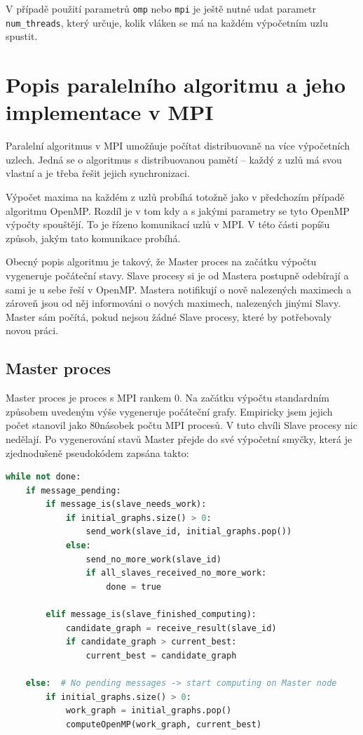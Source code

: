 \documentclass[czech]{article}
\newcommand{\graphspermpiproc}{80}
\begin{document}
V případě použití parametrů \texttt{omp} nebo \texttt{mpi} je ještě nutné udat parametr \texttt{num\_threads}, který určuje, kolik vláken se má na každém výpočetním uzlu spustit.

\section{Popis paralelního algoritmu a jeho implementace v MPI}
Paralelní algoritmus v MPI umožňuje počítat distribuovaně na více výpočetních uzlech. Jedná se o algoritmus s distribuovanou pamětí -- každý z uzlů má svou vlastní a je třeba řešit jejich synchronizaci.

Výpočet maxima na každém z uzlů probíhá totožně jako v předchozím případě algoritmu OpenMP. Rozdíl je v tom kdy a s jakými parametry se tyto OpenMP výpočty spouštějí. To je řízeno komunikací uzlů v MPI. V této části popíšu způsob, jakým tato komunikace probíhá.

Obecný popis algoritmu je takový, že Master proces na začátku výpočtu vygeneruje počáteční stavy. Slave procesy si je od Mastera postupně odebírají a sami je u sebe řeší v OpenMP. Mastera notifikují o nově nalezených maximech a zároveň jsou od něj informováni o nových maximech, nalezených jinými Slavy. Master sám počítá, pokud nejsou žádné Slave procesy, které by potřebovaly novou práci.

\subsection{Master proces}
Master proces je proces s MPI rankem 0. Na začátku výpočtu standardním způsobem uvedeným výše vygeneruje počáteční grafy. Empiricky jsem jejich počet stanovil jako \graphspermpiproc{}násobek počtu MPI procesů. V tuto chvíli Slave procesy nic nedělají. Po vygenerování stavů Master přejde do své výpočetní smyčky, která je zjednodušeně pseudokódem zapsána takto:

\begin{lstlisting}[tabsize=2,language=python]
while not done:
	if message_pending:
		if message_is(slave_needs_work):
			if initial_graphs.size() > 0:
				send_work(slave_id, initial_graphs.pop())
			else:
				send_no_more_work(slave_id)
				if all_slaves_received_no_more_work:
					done = true
					
		elif message_is(slave_finished_computing):
			candidate_graph = receive_result(slave_id)
			if candidate_graph > current_best:
				current_best = candidate_graph
				
	else:  # No pending messages -> start computing on Master node
		if initial_graphs.size() > 0:
			work_graph = initial_graphs.pop()
			computeOpenMP(work_graph, current_best)
\end{lstlisting}
\end{document}
